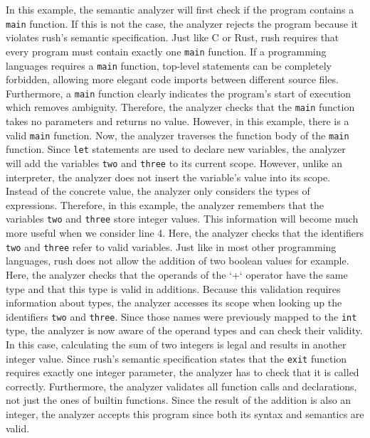 
In this example, the semantic analyzer will first check if the program contains
a \texttt{main} function. If this is not the case, the analyzer rejects the program
because it violates rush's semantic specification. Just like C or Rust, rush
requires that every program must contain exactly one \texttt{main} function. If a
programming languages requires a \texttt{main} function, top-level statements can be
completely forbidden, allowing more elegant code imports between different
source files. Furthermore, a \texttt{main} function clearly indicates the program's
start of execution which removes ambiguity. Therefore, the analyzer checks that
the \texttt{main} function takes no parameters and returns no value. However, in this
example, there is a valid \texttt{main} function. Now, the analyzer traverses the
function body of the \texttt{main} function. Since \texttt{let} statements are used to declare
new variables, the analyzer will add the variables \texttt{two} and \texttt{three} to its
current scope. However, unlike an interpreter, the analyzer does not insert the
variable's value into its scope. Instead of the concrete value, the analyzer
only considers the types of expressions. Therefore, in this example, the
analyzer remembers that the variables \texttt{two} and \texttt{three} store integer values.
This information will become much more useful when we consider line 4. Here, the
analyzer checks that the identifiers \texttt{two} and \texttt{three} refer to valid variables.
Just like in most other programming languages, rush does not allow the addition
of two boolean values for example. Here, the analyzer checks that the operands
of the `+` operator have the same type and that this type is valid in additions.
Because this validation requires information about types, the analyzer accesses
its scope when looking up the identifiers \texttt{two} and \texttt{three}. Since those names
were previously mapped to the \texttt{int} type, the analyzer is now aware of the
operand types and can check their validity. In this case, calculating the
sum of two integers is legal and results in another integer value. Since rush's
semantic specification states that the \texttt{exit} function requires exactly one
integer parameter, the analyzer has to check that it is called correctly.
Furthermore, the analyzer validates all function calls and declarations, not
just the ones of builtin functions. Since the result of the addition is also an
integer, the analyzer accepts this program since both its syntax and semantics
are valid.

